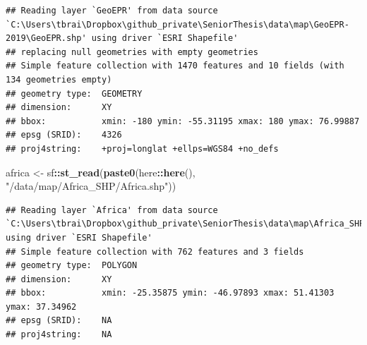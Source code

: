 \documentclass[
]{article}
\newenvironment{Shaded}{\begin{snugshade}}{\end{snugshade}}
\newcommand{\DecValTok}[1]{\textcolor[rgb]{0.00,0.00,0.81}{#1}}
\newcommand{\KeywordTok}[1]{\textcolor[rgb]{0.13,0.29,0.53}{\textbf{#1}}}
\newcommand{\NormalTok}[1]{#1}
\newcommand{\OperatorTok}[1]{\textcolor[rgb]{0.81,0.36,0.00}{\textbf{#1}}}
\newcommand{\StringTok}[1]{\textcolor[rgb]{0.31,0.60,0.02}{#1}}
\begin{document}
\begin{Shaded}
\end{Shaded}

\begin{verbatim}
## Reading layer `GeoEPR' from data source `C:\Users\tbrai\Dropbox\github_private\SeniorThesis\data\map\GeoEPR-2019\GeoEPR.shp' using driver `ESRI Shapefile'
## replacing null geometries with empty geometries
## Simple feature collection with 1470 features and 10 fields (with 134 geometries empty)
## geometry type:  GEOMETRY
## dimension:      XY
## bbox:           xmin: -180 ymin: -55.31195 xmax: 180 ymax: 76.99887
## epsg (SRID):    4326
## proj4string:    +proj=longlat +ellps=WGS84 +no_defs
\end{verbatim}

\begin{Shaded}
\begin{Highlighting}[]
\NormalTok{africa <-}\StringTok{ }\NormalTok{sf}\OperatorTok{::}\KeywordTok{st_read}\NormalTok{(}\KeywordTok{paste0}\NormalTok{(here}\OperatorTok{::}\KeywordTok{here}\NormalTok{(), }\StringTok{"/data/map/Africa_SHP/Africa.shp"}\NormalTok{))}
\end{Highlighting}
\end{Shaded}

\begin{verbatim}
## Reading layer `Africa' from data source `C:\Users\tbrai\Dropbox\github_private\SeniorThesis\data\map\Africa_SHP\Africa.shp' using driver `ESRI Shapefile'
## Simple feature collection with 762 features and 3 fields
## geometry type:  POLYGON
## dimension:      XY
## bbox:           xmin: -25.35875 ymin: -46.97893 xmax: 51.41303 ymax: 37.34962
## epsg (SRID):    NA
## proj4string:    NA
\end{verbatim}
\end{document}
